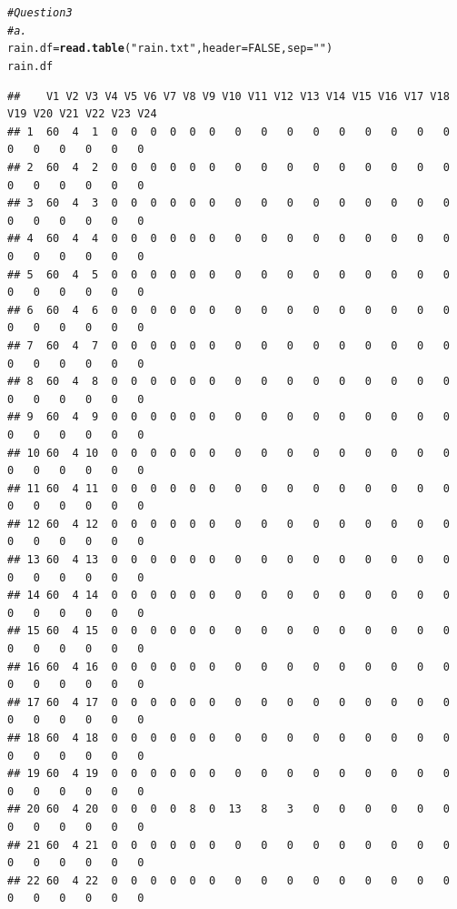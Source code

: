 \documentclass{article}\usepackage[]{graphicx}\usepackage[]{xcolor}
\makeatletter
\newcommand{\hlnum}[1]{\textcolor[rgb]{0.686,0.059,0.569}{#1}}%
\newcommand{\hlstr}[1]{\textcolor[rgb]{0.192,0.494,0.8}{#1}}%
\newcommand{\hlcom}[1]{\textcolor[rgb]{0.678,0.584,0.686}{\textit{#1}}}%
\newcommand{\hlstd}[1]{\textcolor[rgb]{0.345,0.345,0.345}{#1}}%
\newcommand{\hlkwb}[1]{\textcolor[rgb]{0.69,0.353,0.396}{#1}}%
\newcommand{\hlkwc}[1]{\textcolor[rgb]{0.333,0.667,0.333}{#1}}%
\newcommand{\hlkwd}[1]{\textcolor[rgb]{0.737,0.353,0.396}{\textbf{#1}}}%
\newenvironment{kframe}{%
 \def\at@end@of@kframe{}%
 \ifinner\ifhmode%
  \def\at@end@of@kframe{\end{minipage}}%
  \begin{minipage}{\columnwidth}%
 \fi\fi%
 \def\FrameCommand##1{\hskip\@totalleftmargin \hskip-\fboxsep
 \colorbox{shadecolor}{##1}\hskip-\fboxsep
     \hskip-\linewidth \hskip-\@totalleftmargin \hskip\columnwidth}%
 \MakeFramed {\advance\hsize-\width
   \@totalleftmargin\z@ \linewidth\hsize
   \@setminipage}}%
 {\par\unskip\endMakeFramed%
 \at@end@of@kframe}
\newenvironment{knitrout}{}{} %
\makeatother
\begin{document}
\begin{knitrout}
\begin{kframe}
{\ttfamily\noindent\bfseries\color{errorcolor}{\#\# Error in mean(cuckoosLongLength\$breadth): object 'cuckoosLongLength' not found}}\begin{alltt}
\hlcom{#Question 3}
\hlcom{#a.}
\hlstd{rain.df} \hlkwb{=} \hlkwd{read.table}\hlstd{(}\hlstr{"rain.txt"}\hlstd{,}\hlkwc{header}\hlstd{=}\hlnum{FALSE}\hlstd{,}\hlkwc{sep}\hlstd{=}\hlstr{""}\hlstd{)}
\hlstd{rain.df}
\end{alltt}
\begin{verbatim}
##    V1 V2 V3 V4 V5 V6 V7 V8 V9 V10 V11 V12 V13 V14 V15 V16 V17 V18 V19 V20 V21 V22 V23 V24
## 1  60  4  1  0  0  0  0  0  0   0   0   0   0   0   0   0   0   0   0   0   0   0   0   0
## 2  60  4  2  0  0  0  0  0  0   0   0   0   0   0   0   0   0   0   0   0   0   0   0   0
## 3  60  4  3  0  0  0  0  0  0   0   0   0   0   0   0   0   0   0   0   0   0   0   0   0
## 4  60  4  4  0  0  0  0  0  0   0   0   0   0   0   0   0   0   0   0   0   0   0   0   0
## 5  60  4  5  0  0  0  0  0  0   0   0   0   0   0   0   0   0   0   0   0   0   0   0   0
## 6  60  4  6  0  0  0  0  0  0   0   0   0   0   0   0   0   0   0   0   0   0   0   0   0
## 7  60  4  7  0  0  0  0  0  0   0   0   0   0   0   0   0   0   0   0   0   0   0   0   0
## 8  60  4  8  0  0  0  0  0  0   0   0   0   0   0   0   0   0   0   0   0   0   0   0   0
## 9  60  4  9  0  0  0  0  0  0   0   0   0   0   0   0   0   0   0   0   0   0   0   0   0
## 10 60  4 10  0  0  0  0  0  0   0   0   0   0   0   0   0   0   0   0   0   0   0   0   0
## 11 60  4 11  0  0  0  0  0  0   0   0   0   0   0   0   0   0   0   0   0   0   0   0   0
## 12 60  4 12  0  0  0  0  0  0   0   0   0   0   0   0   0   0   0   0   0   0   0   0   0
## 13 60  4 13  0  0  0  0  0  0   0   0   0   0   0   0   0   0   0   0   0   0   0   0   0
## 14 60  4 14  0  0  0  0  0  0   0   0   0   0   0   0   0   0   0   0   0   0   0   0   0
## 15 60  4 15  0  0  0  0  0  0   0   0   0   0   0   0   0   0   0   0   0   0   0   0   0
## 16 60  4 16  0  0  0  0  0  0   0   0   0   0   0   0   0   0   0   0   0   0   0   0   0
## 17 60  4 17  0  0  0  0  0  0   0   0   0   0   0   0   0   0   0   0   0   0   0   0   0
## 18 60  4 18  0  0  0  0  0  0   0   0   0   0   0   0   0   0   0   0   0   0   0   0   0
## 19 60  4 19  0  0  0  0  0  0   0   0   0   0   0   0   0   0   0   0   0   0   0   0   0
## 20 60  4 20  0  0  0  0  8  0  13   8   3   0   0   0   0   0   0   0   0   0   0   0   0
## 21 60  4 21  0  0  0  0  0  0   0   0   0   0   0   0   0   0   0   0   0   0   0   0   0
## 22 60  4 22  0  0  0  0  0  0   0   0   0   0   0   0   0   0   0   0   0   0   0   0   0

\end{verbatim}
\end{kframe}
\end{knitrout}
\end{document}
